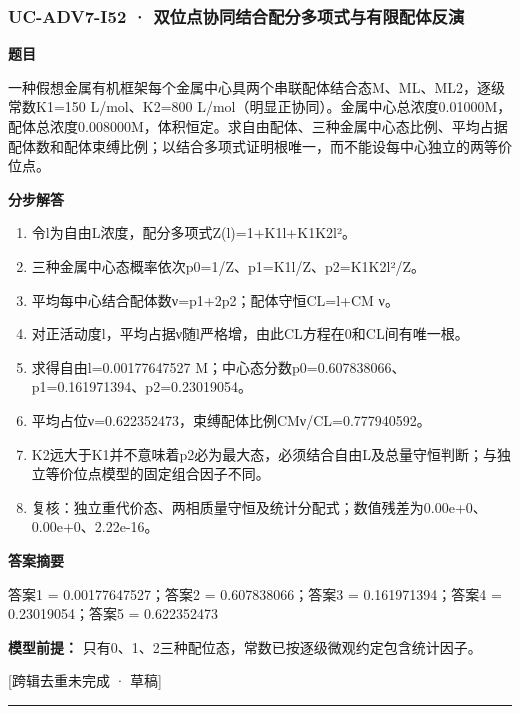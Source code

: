 \documentclass[UTF8,11pt,a4paper]{ctexart}
\begin{document}
\subsubsection*{UC-ADV7-I52 · 双位点协同结合配分多项式与有限配体反演}
\noindent\textbf{题目}\par
一种假想金属有机框架每个金属中心具两个串联配体结合态M、ML、ML2，逐级常数K1=150 L/mol、K2=800 L/mol（明显正协同）。金属中心总浓度0.01000M，配体总浓度0.008000M，体积恒定。求自由配体、三种金属中心态比例、平均占据配体数和配体束缚比例；以结合多项式证明根唯一，而不能设每中心独立的两等价位点。\par
\medskip\noindent\textbf{分步解答}
\begin{enumerate}
\item 令l为自由L浓度，配分多项式Z(l)=1+K1l+K1K2l²。
\item 三种金属中心态概率依次p0=1/Z、p1=K1l/Z、p2=K1K2l²/Z。
\item 平均每中心结合配体数ν=p1+2p2；配体守恒CL=l+CM ν。
\item 对正活动度l，平均占据ν随l严格增，由此CL方程在0和CL间有唯一根。
\item 求得自由l=0.00177647527 M；中心态分数p0=0.607838066、p1=0.161971394、p2=0.23019054。
\item 平均占位ν=0.622352473，束缚配体比例CMν/CL=0.777940592。
\item K2远大于K1并不意味着p2必为最大态，必须结合自由L及总量守恒判断；与独立等价位点模型的固定组合因子不同。
\item 复核：独立重代价态、两相质量守恒及统计分配式；数值残差为0.00e+0、0.00e+0、2.22e-16。
\end{enumerate}
\noindent\textbf{答案摘要}\par
答案1 = 0.00177647527；答案2 = 0.607838066；答案3 = 0.161971394；答案4 = 0.23019054；答案5 = 0.622352473\par
\noindent\textbf{模型前提：}
只有0、1、2三种配位态，常数已按逐级微观约定包含统计因子。\par
\noindent\textcolor{red!65!black}{[跨辑去重未完成 · 草稿]} \par
\medskip\hrule\medskip
{}
\end{document}
